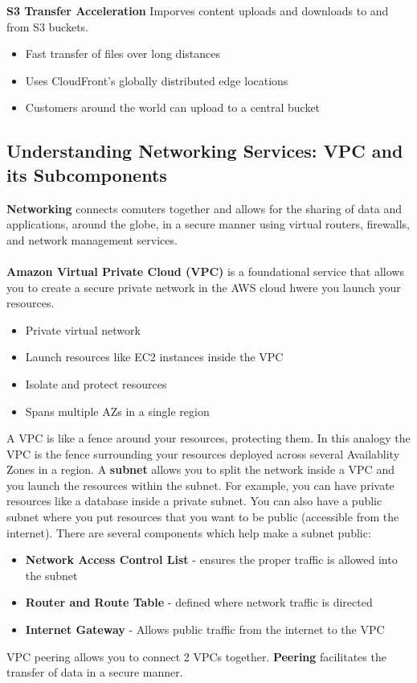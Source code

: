 \documentclass{article}%
\begin{document}
\textbf{S3 Transfer Acceleration} Imporves content uploads and downloads to and from S3 buckets.
\begin{itemize}
    \item Fast transfer of files over long distances
    \item Uses CloudFront's globally distributed edge locations
    \item Customers around the world can upload to a central bucket
\end{itemize}

\subsection{Understanding Networking Services: VPC and its Subcomponents}
\textbf{Networking} connects comuters together and allows for the sharing of data and applications, around the globe, in a secure manner using virtual routers, firewalls, and network management services. \\ \\
\textbf{Amazon Virtual Private Cloud (VPC)} is a foundational service that allows you to create a secure private network in the AWS cloud hwere you launch your resources.
\begin{itemize}
    \item Private virtual network
    \item Launch resources like EC2 instances inside the VPC
    \item Isolate and protect resources
    \item Spans multiple AZs in a single region
\end{itemize} 
A VPC is like a fence around your resources, protecting them. In this analogy the VPC is the fence surrounding your resources deployed across several Availablity Zones in a region. A \textbf{subnet} allows you to split the network inside a VPC and you launch the resources within the subnet. For example, you can have private resources like a database inside a private subnet. You can also have a public subnet where you put resources that you want to be public (accessible from the internet).
There are several components which help make a subnet public: 
\begin{itemize}
    \item \textbf{Network Access Control List} - ensures the proper traffic is allowed into the subnet
    \item \textbf{Router and Route Table} - defined where network traffic is directed
    \item \textbf{Internet Gateway} - Allows public traffic from the internet to the VPC
\end{itemize}
VPC peering allows you to connect 2 VPCs together. \textbf{Peering} facilitates the transfer of data in a secure manner.
\end{document}
